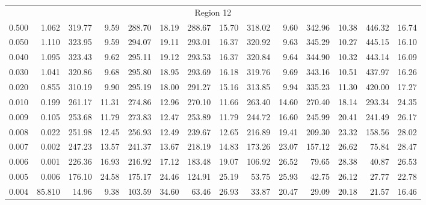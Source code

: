 \begin{tabular}{@{}lrrrrrrrrrrrrr@{}}
\midrule
\multicolumn{14}{c}{Region 12} \\
\cmidrule{1-14}
0.500 & 1.062 & 319.77 & 9.59 & 288.70 & 18.19 & 288.67 & 15.70 & 318.02 & 9.60 & 342.96 & 10.38 & 446.32 & 16.74 \\
0.050 & 1.110 & 323.95 & 9.59 & 294.07 & 19.11 & 293.01 & 16.37 & 320.92 & 9.63 & 345.29 & 10.27 & 445.15 & 16.10 \\
0.040 & 1.095 & 323.43 & 9.62 & 295.11 & 19.12 & 293.53 & 16.37 & 320.84 & 9.64 & 344.90 & 10.32 & 443.14 & 16.09 \\
0.030 & 1.041 & 320.86 & 9.68 & 295.80 & 18.95 & 293.69 & 16.18 & 319.76 & 9.69 & 343.16 & 10.51 & 437.97 & 16.26 \\
0.020 & 0.855 & 310.19 & 9.90 & 295.19 & 18.00 & 291.27 & 15.16 & 313.85 & 9.94 & 335.23 & 11.30 & 420.00 & 17.27 \\
0.010 & 0.199 & 261.17 & 11.31 & 274.86 & 12.96 & 270.10 & 11.66 & 263.40 & 14.60 & 270.40 & 18.14 & 293.34 & 24.35 \\
0.009 & 0.105 & 253.68 & 11.79 & 273.83 & 12.47 & 253.89 & 11.79 & 244.72 & 16.60 & 245.99 & 20.41 & 241.49 & 26.17 \\
0.008 & 0.022 & 251.98 & 12.45 & 256.93 & 12.49 & 239.67 & 12.65 & 216.89 & 19.41 & 209.30 & 23.32 & 158.56 & 28.02 \\
0.007 & 0.002 & 247.23 & 13.57 & 241.37 & 13.67 & 218.19 & 14.83 & 173.26 & 23.07 & 157.12 & 26.62 & 75.84 & 28.47 \\
0.006 & 0.001 & 226.36 & 16.93 & 216.92 & 17.12 & 183.48 & 19.07 & 106.92 & 26.52 & 79.65 & 28.38 & 40.87 & 26.53 \\
0.005 & 0.006 & 176.10 & 24.58 & 175.17 & 24.46 & 124.91 & 25.19 & 53.75 & 25.93 & 42.75 & 26.12 & 27.77 & 22.78 \\
0.004 & 85.810 & 14.96 & 9.38 & 103.59 & 34.60 & 63.46 & 26.93 & 33.87 & 20.47 & 29.09 & 20.18 & 21.57 & 16.46 \\


\end{tabular}
